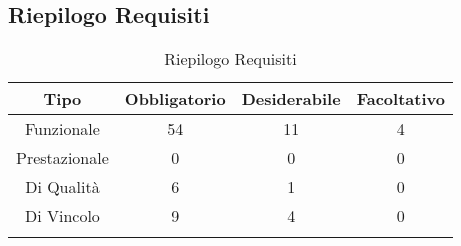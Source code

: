 \subsection{Riepilogo Requisiti}
\normalsize
\begingroup
\renewcommand\arraystretch{2}
\begin{longtable}{|c|c|c|c|}
\hline 
\textbf{Tipo} & \textbf{Obbligatorio} & \textbf{Desiderabile} & \textbf{Facoltativo}\\
\hline
Funzionale & 54 & 11 & 4\\ \hline
Prestazionale & 0 & 0 & 0\\ \hline
Di Qualità & 6 & 1 & 0\\ \hline
Di Vincolo & 9 & 4  & 0\\ \hline
\caption[Riepilogo Requisiti]{Riepilogo Requisiti}
\label{tabella:riepilogorequi}
\end{longtable}
\endgroup
\clearpage